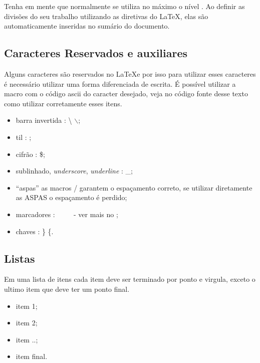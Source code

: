 Tenha em mente que normalmente se utiliza no máximo o nível .
Ao definir as divisões do seu trabalho utilizando as diretivas do \LaTeX, elas são automaticamente inseridas no sumário do documento.


\subsection{Caracteres Reservados e auxiliares}



Alguns caracteres são reservados no \LaTeX \space e por isso para utilizar esses caracteres é necessário utilizar uma forma diferenciada de escrita. É possível utilizar a macro  com o código \ac{ascii} do caracter desejado, veja no código fonte desse texto como utilizar corretamente esses itens.


\begin{itemize}
\item barra invertida : \textbackslash   {}    $\backslash$;
\item til  :   ;
\item cifrão : \$;
\item sublinhado, \emph{underscore}, \emph{underline} : \_;
\item \enquote{aspas} as macros  /  garantem o espaçamento correto, se utilizar diretamente as ASPAS o espaçamento é perdido;
\item marcadores : \cmark\ \xmark\ \circlemark\  \ - ver mais no ;
\item chaves : \} \{.
\end{itemize}

\subsection{Listas}

Em uma lista de itens cada item deve ser terminado por ponto e virgula, exceto o ultimo item que deve ter um ponto final.

\begin{itemize}
\item item 1;
\item item 2;
\item item ..;
\item item final.
\end{itemize}


